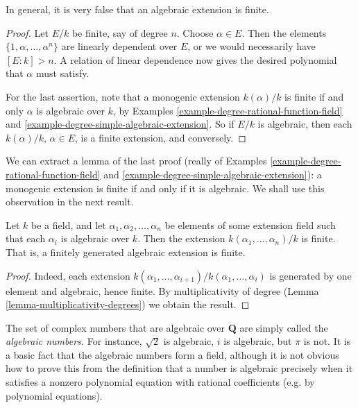 \noindent
In general, it is very false that an algebraic extension is finite.

\begin{proof}
Let $E/k$ be finite, say of degree $n$. Choose $\alpha \in E$. Then the
elements $\{1, \alpha, \dots, \alpha^n\}$ are linearly
dependent over $E$, or we would necessarily have $[E : k] > n$. A relation of
linear dependence now gives the desired polynomial that $\alpha$ must satisfy.

\medskip\noindent
For the last assertion, note that a monogenic extension $k(\alpha)/k$ is
finite if and only $\alpha$ is algebraic over $k$, by
Examples \ref{example-degree-rational-function-field} and
\ref{example-degree-simple-algebraic-extension}.
So if $E/k$ is algebraic, then each $k(\alpha)/k$, $\alpha \in E$, is a finite
extension, and conversely.
\end{proof}

\noindent
We can extract a lemma of the last proof (really of
Examples \ref{example-degree-rational-function-field} and
\ref{example-degree-simple-algebraic-extension}):
a monogenic extension is finite if and only if it is algebraic.
We shall use this observation in the next result.

\begin{lemma}
\label{lemma-algebraic-finitely-generated}
Let $k$ be a field, and let $\alpha_1, \alpha_2, \dots, \alpha_n$ be elements
of some extension field such that each $\alpha_i$ is algebraic over $k$. Then
the extension $k(\alpha_1, \dots, \alpha_n)/k$ is finite.
That is, a finitely generated algebraic extension is finite.
\end{lemma}

\begin{proof}
Indeed, each extension
$k(\alpha_{1}, \dots, \alpha_{i+1})/k(\alpha_1, \dots, \alpha_{i})$
is generated by one element and algebraic, hence finite.
By multiplicativity of degree (Lemma \ref{lemma-multiplicativity-degrees})
we obtain the result.
\end{proof}

\noindent
The set of complex numbers that are algebraic over $\mathbf{Q}$ are simply
called the {\it algebraic numbers.} For instance, $\sqrt{2}$ is algebraic,
$i$ is algebraic, but $\pi$ is not.
It is a basic fact that the algebraic numbers form a field, although it is not
obvious how to prove this from the definition that a number is algebraic
precisely when it satisfies a nonzero polynomial equation with rational
coefficients (e.g. by polynomial equations).


